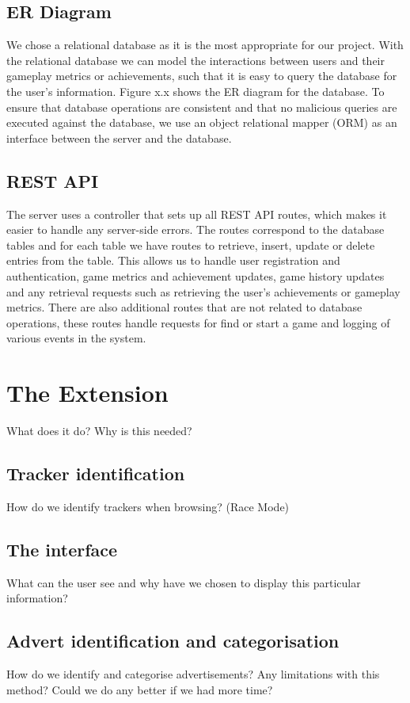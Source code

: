 \documentclass{l4proj}
\begin{document}
\subsection{ER Diagram}
We chose a relational database as it is the most appropriate for our project. With the relational database we can model the interactions between users and their gameplay metrics or achievements, such that it is easy to query the database for the user's information. Figure x.x shows the ER diagram for the database. To ensure that database operations are consistent and that no malicious queries are executed against the database, we use an object relational mapper (ORM) as an interface between the server and the database.

\subsection{REST API}
The server uses a controller that sets up all REST API routes, which makes it easier to handle any server-side errors. The routes correspond to the database tables and for each table we have routes to retrieve, insert, update or delete entries from the table. This allows us to handle user registration and authentication, game metrics and achievement updates, game history updates and any retrieval requests such as retrieving the user's achievements or gameplay metrics. There are also additional routes that are not related to database operations, these routes handle requests for find or start a game and logging of various events in the system.

\section{The Extension}
What does it do? Why is this needed?

\subsection{Tracker identification}
How do we identify trackers when browsing? (Race Mode)

\subsection{The interface}
What can the user see and why have we chosen to display this particular information?

\subsection{Advert identification and categorisation}
How do we identify and categorise advertisements? Any limitations with this method? Could we do any better if we had more time?
\end{document}
